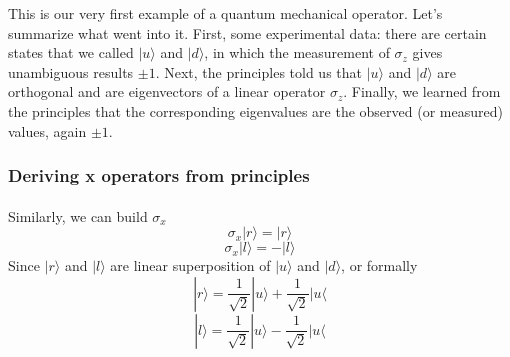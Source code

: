 \documentclass[a4paper,10pt]{article}
\begin{document}
This is our very first example of a quantum mechanical operator. Let's summarize what went into it. First, some experimental data: there are certain states that we called $|u\rangle$ and $|d\rangle$, in which the measurement of $\sigma_{z}$ gives unambiguous results $\pm 1$. Next, the principles told us that $|u\rangle$ and $|d\rangle$ are orthogonal and are eigenvectors of a linear operator $\sigma_{z}$. Finally, we learned from the principles that the corresponding eigenvalues are the observed (or measured) values, again $\pm 1$.

\subsubsection{Deriving x operators from principles}

\paragraph{} Similarly, we can build $\sigma_x$
$$\sigma_x|r\rangle = |r\rangle$$
$$\sigma_x|l\rangle = -|l\rangle$$
Since $|r\rangle$ and $|l\rangle$ are linear superposition of $|u\rangle$ and $|d\rangle$, or formally
$$|r\rangle = \frac{1}{\sqrt{2}}|u\rangle + \frac{1}{\sqrt{2}}|u\langle$$
$$|l\rangle = \frac{1}{\sqrt{2}}|u\rangle - \frac{1}{\sqrt{2}}|u\langle$$
\end{document}
